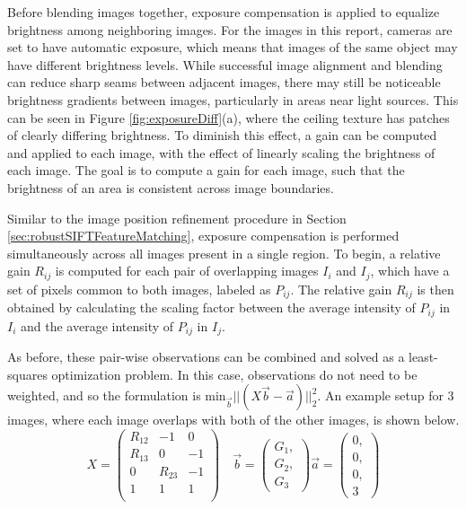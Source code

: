 \documentclass[]{spie}  %
\begin{document}
Before blending images together, exposure compensation is applied to
equalize brightness among neighboring images. For the images in this
report, cameras are set to have automatic exposure, which means that
images of the same object may have different brightness levels. While
successful image alignment and blending can reduce sharp seams between
adjacent images, there may still be noticeable brightness gradients
between images, particularly in areas near light sources. This can be
seen in Figure \ref{fig:exposureDiff}(a), where the ceiling texture
has patches of clearly differing brightness. To diminish this effect,
a gain can be computed and applied to each image, with the effect of
linearly scaling the brightness of each image. The goal is to compute
a gain for each image, such that the brightness of an area is
consistent across image boundaries.

Similar to the image position refinement procedure in Section
\ref{sec:robustSIFTFeatureMatching}, exposure compensation is
performed simultaneously across all images present in a single
region. To begin, a relative gain $R_{ij}$ is computed for each pair
of overlapping images $I_i$ and $I_j$, which have a set of pixels
common to both images, labeled as $P_{ij}$. The relative gain $R_{ij}$
is then obtained by calculating the scaling factor between the average
intensity of $P_{ij}$ in $I_i$ and the average intensity of $P_{ij}$
in $I_j$.

As before, these pair-wise observations can be combined and solved as
a least-squares optimization problem. In this case, observations do
not need to be weighted, and so the formulation is
$\textrm{min}_{\vec{b}} ||(X \vec{b} - \vec{a})||_2^2 $. An example
setup for 3 images, where each image overlaps with both of the other
images, is shown below.
\[
X =
\begin{pmatrix}
  R_{12} & -1 & 0\\
  R_{13} & 0 & -1\\
  0 & R_{23} & -1\\
  1 & 1 & 1\\

\end{pmatrix}\quad
\vec{b} =
\begin{pmatrix}
  G_1, \\ G_2, \\ G_3
\end{pmatrix}
\vec{a} =
\begin{pmatrix}
  0, \\ 0, \\ 0, \\ 3
\end{pmatrix}
\]
\end{document}
